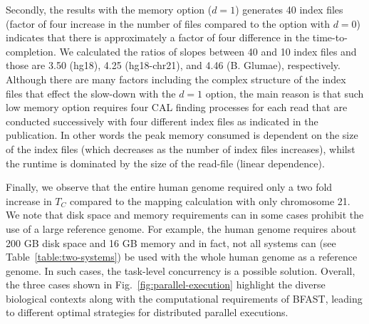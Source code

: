 \documentclass{cpeauth}
\begin{document}

Secondly, the results with the memory option ($d=1$) generates 40
index files (factor of four increase in the number of files compared to the option with $d=0$) indicates
that there is approximately a factor of four difference in the
time-to-completion.  We calculated the ratios of slopes between 40 and
10 index files and those are 3.50 (hg18), 4.25 (hg18-chr21), and 4.46
(B. Glumae), respectively.  Although there are many factors including the
complex structure of the index files that effect the slow-down with the
$d=1$ option, the main reason is that such low memory option
requires four CAL finding processes for each read that are conducted
successively with four different index files as indicated in the
publication\cite{bfast2009}. In other words the peak memory consumed is dependent on the
size of the index files (which decreases as the number of index files
increases), whilst the runtime is dominated by the size of the
read-file (linear dependence).

Finally, we observe that the entire human genome required only a two
fold increase in $T_C$ compared to the mapping calculation with only
chromosome 21.  %
We note that disk space and memory requirements can in some cases
prohibit the use of a large reference genome.  For example, the human
genome requires about 200 GB disk space and 16 GB memory and in fact,
not all systems can (see Table~\ref{table:two-systems}) be used with
the whole human genome as a reference genome.  In such cases, the
task-level concurrency is a possible solution.  Overall, the three
cases shown in Fig.~\ref{fig:parallel-execution} highlight the diverse
biological contexts along with the computational requirements of
BFAST, leading to different optimal strategies for distributed
parallel executions.

\end{document}
